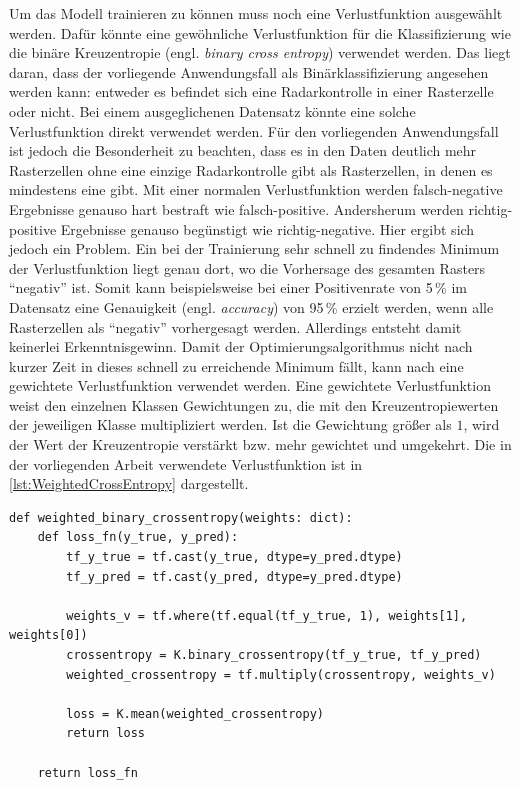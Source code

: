 Um das Modell trainieren zu können muss noch eine Verlustfunktion ausgewählt werden.
Dafür könnte eine gewöhnliche Verlustfunktion für die Klassifizierung wie die binäre Kreuzentropie (engl. \emph{binary cross entropy}) verwendet werden.
Das liegt daran, dass der vorliegende Anwendungsfall als Binärklassifizierung angesehen werden kann: entweder es befindet sich eine Radarkontrolle in einer Rasterzelle oder nicht.
Bei einem ausgeglichenen Datensatz könnte eine solche Verlustfunktion direkt verwendet werden.
Für den vorliegenden Anwendungsfall ist jedoch die Besonderheit zu beachten, dass es in den Daten deutlich mehr Rasterzellen ohne eine einzige Radarkontrolle gibt als Rasterzellen, in denen es mindestens eine gibt.
Mit einer normalen Verlustfunktion werden falsch-negative Ergebnisse genauso hart bestraft wie falsch-positive.
Andersherum werden richtig-positive Ergebnisse genauso begünstigt wie richtig-negative.
Hier ergibt sich jedoch ein Problem.
Ein bei der Trainierung sehr schnell zu findendes Minimum der Verlustfunktion liegt genau dort, wo die Vorhersage des gesamten Rasters "`negativ"' ist.
Somit kann beispielsweise bei einer Positivenrate von 5\,\% im Datensatz eine Genauigkeit (engl. \emph{accuracy}) von 95\,\% erzielt werden, wenn alle Rasterzellen als "`negativ"' vorhergesagt werden.
Allerdings entsteht damit keinerlei Erkenntnisgewinn.
Damit der Optimierungsalgorithmus nicht nach kurzer Zeit in dieses schnell zu erreichende Minimum fällt, kann nach \cite{CrimeConvLSTM} eine gewichtete Verlustfunktion verwendet werden.
Eine gewichtete Verlustfunktion weist den einzelnen Klassen Gewichtungen zu, die mit den Kreuzentropiewerten der jeweiligen Klasse multipliziert werden.
Ist die Gewichtung größer als $1$, wird der Wert der Kreuzentropie verstärkt bzw. mehr gewichtet und umgekehrt.
Die in der vorliegenden Arbeit verwendete Verlustfunktion ist in \autoref{lst:WeightedCrossEntropy} dargestellt.

\begin{code}
\begin{verbatim}
def weighted_binary_crossentropy(weights: dict):
    def loss_fn(y_true, y_pred):
        tf_y_true = tf.cast(y_true, dtype=y_pred.dtype)
        tf_y_pred = tf.cast(y_pred, dtype=y_pred.dtype)

        weights_v = tf.where(tf.equal(tf_y_true, 1), weights[1], weights[0])
        crossentropy = K.binary_crossentropy(tf_y_true, tf_y_pred)
        weighted_crossentropy = tf.multiply(crossentropy, weights_v)

        loss = K.mean(weighted_crossentropy)
        return loss

    return loss_fn
\end{verbatim}
\label{lst:WeightedCrossEntropy}
\end{code}

